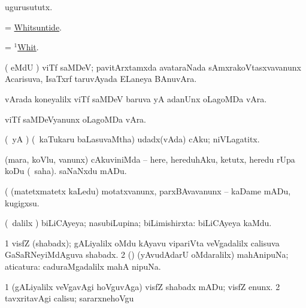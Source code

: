\bentry
{}
\gl{\nA}
\bmng
ugurusututx. 
\emng
\eentry

\bentry
{} 
\gl{\nA}
\expl{}
\bmng
= \hyperlink{Whitsuntide}{Whitsuntide}. 
\emng
\eentry

\bentry
{} 
\gl{\gu}
\expl{}
\bmng
= \hyperlink{Whit(1)}{$^1$Whit}. 
\emng
\eentry

\bentry
{} 
\gl{\nA}
\expl{}
\bmng
( eMdU \parx) viTf saMDeV; pavitArxtamxda avataraNada sAmxrakoVtasxvavanunx Acarisuva, IsaTxrf taruvAyada ELaneya BAnuvAra. 
\emng
\eentry

\bentry
{}
\gl{\nA}
\bmng
vArada koneyalilx viTf saMDeV baruva yA adanUnx oLagoMDa vAra. 
\emng
\eentry

\bentry
{}
\gl{\nA}
\bmng
viTf saMDeVyanunx oLagoMDa vAra. 
\emng
\eentry

\bentry
{} 
\gl{\nA}
\expl{}
\bmng
(\pArxparx\ yA \pArxM) (\kanmu\ kaTukaru baLasuvaMtha) udadx(vAda) cAku; niVLagatitx. 
\emng
\eentry

\bentry
{} 
\gl{\sakirx}
\expl{}
\bmng
(mara, koVlu, \mo vanunx) 
\banum
{} cAkuviniMda -- here, hereduhAku, ketutx, heredu rUpa koDu (\akirx\ saha). 
 saNaNxdu mADu. 
\eanum
\emng

\noindent
\gl{\pagu}
\bmng
{} (  (matetxmatetx kaLedu) motatxvanunx, parxBAvavanunx -- kaDame mADu, kugigxsu. 
\emng
\eentry

\bentry
{} 
\gl{\gu}
\expl{}
\bmng
(\sA\ \saMpa dalilx \parx) biLiCAyeya; nasubiLupina; biLimishirxta:  biLiCAyeya kaMdu. 
\emng
\eentry

\bentry
{} 
\gl{\nA}
\expl{}
\bmng
\bnum
\num{1} visfZ (shabadx); gALiyalilx oMdu kAyavu vipariVta veVgadalilx calisuva GaSaRNeyiMdAguva shabadx. 
\num{2} (\AmA) (yAvudAdarU oMdaralilx) mahAnipuNa; aticatura:  caduraMgadalilx mahA nipuNa. 
\enum
\emng
\eentry

\bentry
{} 
\gl{\akirx}
\bmng
\bnum
\num{1} (gALiyalilx veVgavAgi hoVguvAga) visfZ shabadx mADu; visfZ enunx. 
\num{2} tavxritavAgi calisu; sararxnehoVgu 
\enum
\emng
\eentry

